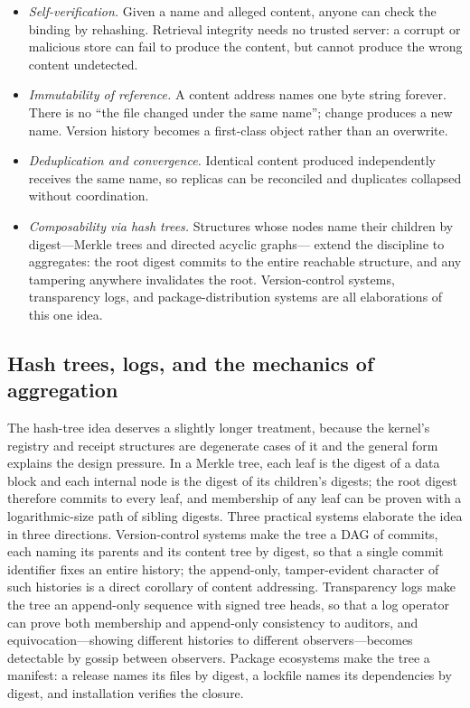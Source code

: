 \begin{itemize}
\item \emph{Self-verification.} Given a name and alleged content,
anyone can check the binding by rehashing. Retrieval integrity needs
no trusted server: a corrupt or malicious store can fail to produce
the content, but cannot produce the wrong content undetected.
\item \emph{Immutability of reference.} A content address names one
byte string forever. There is no ``the file changed under the same
name''; change produces a new name. Version history becomes a
first-class object rather than an overwrite.
\item \emph{Deduplication and convergence.} Identical content produced
independently receives the same name, so replicas can be reconciled
and duplicates collapsed without coordination.
\item \emph{Composability via hash trees.} Structures whose nodes name
their children by digest---Merkle trees and directed acyclic graphs---
extend the discipline to aggregates: the root digest commits to the
entire reachable structure, and any tampering anywhere invalidates
the root. Version-control systems, transparency logs, and
package-distribution systems are all elaborations of this one idea.
\end{itemize}

\subsection{Hash trees, logs, and the mechanics of aggregation}\label{ch02:merkle}

The hash-tree idea deserves a slightly longer treatment, because the
kernel's registry and receipt structures are degenerate cases of it
and the general form explains the design pressure. In a Merkle tree,
each leaf is the digest of a data block and each internal node is the
digest of its children's digests; the root digest therefore commits
to every leaf, and membership of any leaf can be proven with a
logarithmic-size path of sibling digests. Three practical systems
elaborate the idea in three directions. Version-control systems make
the tree a DAG of commits, each naming its parents and its content
tree by digest, so that a single commit identifier fixes an entire
history; the append-only, tamper-evident character of such histories
is a direct corollary of content addressing. Transparency logs make
the tree an append-only sequence with signed tree heads, so that a
log operator can prove both membership and append-only consistency
to auditors, and equivocation---showing different histories to
different observers---becomes detectable by gossip between observers.
Package ecosystems make the tree a manifest: a release names its
files by digest, a lockfile names its dependencies by digest, and
installation verifies the closure.

